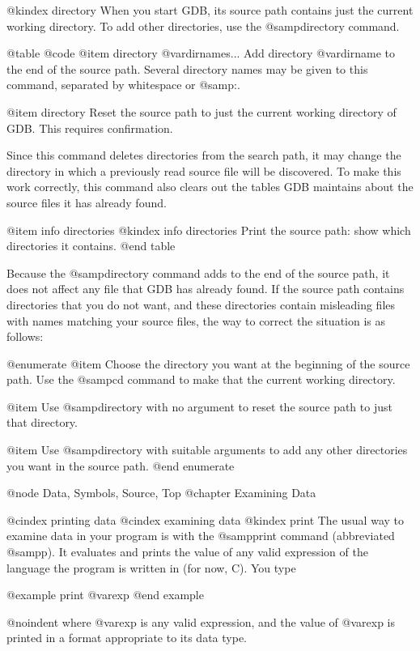 @kindex directory
When you start GDB, its source path contains just the current working
directory.  To add other directories, use the @samp{directory} command.

@table @code
@item directory @var{dirnames...}
Add directory @var{dirname} to the end of the source path.  Several
directory names may be given to this command, separated by whitespace or
@samp{:}.

@item directory
Reset the source path to just the current working directory of GDB.
This requires confirmation.

Since this command deletes directories from the search path, it may
change the directory in which a previously read source file will be
discovered.  To make this work correctly, this command also clears out
the tables GDB maintains about the source files it has already found.

@item info directories
@kindex info directories
Print the source path: show which directories it contains.
@end table

Because the @samp{directory} command adds to the end of the source path,
it does not affect any file that GDB has already found.  If the source
path contains directories that you do not want, and these directories
contain misleading files with names matching your source files, the
way to correct the situation is as follows:

@enumerate
@item
Choose the directory you want at the beginning of the source path.
Use the @samp{cd} command to make that the current working directory.

@item
Use @samp{directory} with no argument to reset the source path to just
that directory.

@item
Use @samp{directory} with suitable arguments to add any other
directories you want in the source path.
@end enumerate

@node Data, Symbols, Source, Top
@chapter Examining Data

@cindex printing data
@cindex examining data
@kindex print
The usual way to examine data in your program is with the @samp{print}
command (abbreviated @samp{p}).  It evaluates and prints the value of any
valid expression of the language the program is written in (for now, C).
You type

@example
print @var{exp}
@end example

@noindent
where @var{exp} is any valid expression, and the value of @var{exp}
is printed in a format appropriate to its data type.

